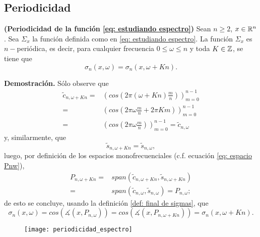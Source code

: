 \subsection{Periodicidad}
\begin{prop}
\label{prop: periodicidad espectro}
\textbf{(Periodicidad de la función \eqref{eq: estudiando espectro})}
Sean $n \geq 2$, $x \in \mathbb{R}^{n}$.
Sea $\Sigma_{x}$ la función definida como en 
\eqref{eq: estudiando espectro}. La función 
$\Sigma_{x}$ es $n-$periódica, es decir, 
para cualquier frecuencia
$0 \leq \omega \leq n$
y toda $K \in \mathbb{Z}$, se tiene que 
\[
\sigma_{n}(x, \omega) = \sigma_{n}(x, \omega + Kn).
\]
\end{prop}
\noindent
\textbf{Demostración.}
Sólo observe que 
\begin{align*}
\tilde{c}_{n, \omega + Kn} = & \left( cos \left( 2 \pi
\left( \omega + Kn \right) \frac{m}{n} \right) \right)_{m=0}^{n-1} \\
= & \left( cos \left( 
2 \pi \omega \frac{m}{n} + 2 \pi K m
\right) \right)_{m=0}^{n-1} \\
= & \left( cos \left( 
2 \pi \omega \frac{m}{n}
\right) \right)_{m=0}^{n-1} = \tilde{c}_{n, \omega}
\end{align*}
y, similarmente, que 
\[
\tilde{s}_{n, \omega + Kn} = \tilde{s}_{n, \omega},
\]
luego, por definición de los espacios monofrecuenciales
(c.f. ecuación \ref{eq: espacio Pnw}),
\begin{align*}
P_{n, \omega + Kn} =
& span(\tilde{c}_{n, \omega + Kn}, \tilde{s}_{n, \omega + Kn}) \\
= & span(\tilde{c}_{n, \omega }, \tilde{s}_{n, \omega }) = P_{n, \omega};
\end{align*}
de esto se concluye, usando la definición
\ref{def: final de sigmas},
que 
\[
\sigma_{n}(x, \omega) = 
cos (\measuredangle(x, P_{n, \omega}))
= cos (\measuredangle(x, P_{n, \omega + Kn})) = 
\sigma_{n}(x, \omega + Kn).
\]
\QEDB
\vspace{0.2cm}

\begin{figure}[H]
	\centering
	\texttt{[image: periodicidad\_espectro]} 
\end{figure}	


